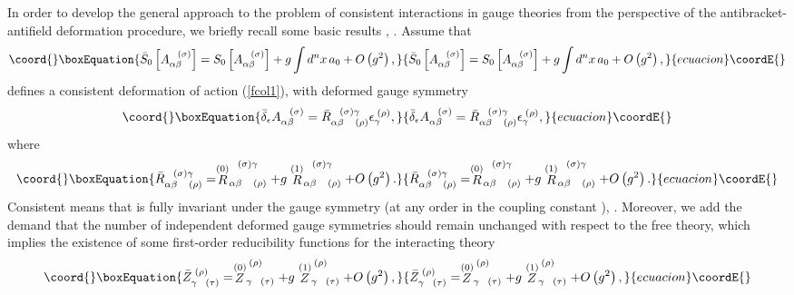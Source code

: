 \documentclass[a4paper,12pt]{article}
\begin{document}
In order to develop the general approach to the problem of consistent
interactions in gauge theories from the perspective of the
antibracket-antifield deformation procedure, we briefly recall some basic
results \cite{17and5}, \cite{21and5}. Assume that 
\begin{equation}\coord{}\boxEquation{
\bar{S}_{0}\left[ A_{\alpha \beta }^{\;\;\;(\sigma )}\right] =S_{0}\left[
A_{\alpha \beta }^{\;\;\;(\sigma )}\right] +g\int d^{n}x\,a_{0}+O\left(
g^{2}\right) ,  \label{fcol26}
}{
\bar{S}_{0}\left[ A_{\alpha \beta }^{\;\;\;(\sigma )}\right] =S_{0}\left[
A_{\alpha \beta }^{\;\;\;(\sigma )}\right] +g\int d^{n}x\,a_{0}+O\left(
g^{2}\right) ,  }{ecuacion}\coordE{}\end{equation}
defines a consistent deformation of action (\ref{fcol1}), with deformed
gauge symmetry 
\begin{equation}\coord{}\boxEquation{
\bar{\delta}_{\epsilon }A_{\alpha \beta }^{\;\;\;(\sigma )}=\bar{R}_{\alpha
\beta \;\;\;\;(\rho )}^{\;\;\;(\sigma )\gamma }\epsilon _{\gamma }^{\;(\rho
)},  \label{defgsym}
}{
\bar{\delta}_{\epsilon }A_{\alpha \beta }^{\;\;\;(\sigma )}=\bar{R}_{\alpha
\beta \;\;\;\;(\rho )}^{\;\;\;(\sigma )\gamma }\epsilon _{\gamma }^{\;(\rho
)},  }{ecuacion}\coordE{}\end{equation}
where 
\begin{equation}\coord{}\boxEquation{
\bar{R}_{\alpha \beta \;\;\;\;(\rho )}^{\;\;\;(\sigma )\gamma }=\stackrel{(0)
}{R}_{\alpha \beta \;\;\;\;(\rho )}^{\;\;\;(\sigma )\gamma }+g\stackrel{(1)}{
R}_{\alpha \beta \;\;\;\;(\rho )}^{\;\;\;(\sigma )\gamma }+O\left(
g^{2}\right) .  \label{fcol27}
}{
\bar{R}_{\alpha \beta \;\;\;\;(\rho )}^{\;\;\;(\sigma )\gamma }=\stackrel{(0)
}{R}_{\alpha \beta \;\;\;\;(\rho )}^{\;\;\;(\sigma )\gamma }+g\stackrel{(1)}{
R}_{\alpha \beta \;\;\;\;(\rho )}^{\;\;\;(\sigma )\gamma }+O\left(
g^{2}\right) .  }{ecuacion}\coordE{}\end{equation}
Consistent means that \coordHE{} is fully invariant under the gauge
symmetry \myHighlight{$\bar{\delta}_{\epsilon }$}\coordHE{} (at any order in the coupling constant \coordHE{}), \coordHE{}. Moreover, we add the demand
that the number of independent deformed gauge symmetries should remain
unchanged with respect to the free theory, which implies the existence of
some first-order reducibility functions for the interacting theory 
\begin{equation}\coord{}\boxEquation{
\bar{Z}_{\gamma \;\;\;(\tau )}^{\;(\rho )}=\stackrel{(0)}{Z}_{\gamma
\;\;\;(\tau )}^{\;(\rho )}+g\stackrel{(1)}{Z}_{\gamma \;\;\;(\tau
)}^{\;(\rho )}+O\left( g^{2}\right) ,  \label{fcol28}
}{
\bar{Z}_{\gamma \;\;\;(\tau )}^{\;(\rho )}=\stackrel{(0)}{Z}_{\gamma
\;\;\;(\tau )}^{\;(\rho )}+g\stackrel{(1)}{Z}_{\gamma \;\;\;(\tau
)}^{\;(\rho )}+O\left( g^{2}\right) ,  }{ecuacion}\coordE{}\end{equation}
\end{document}
